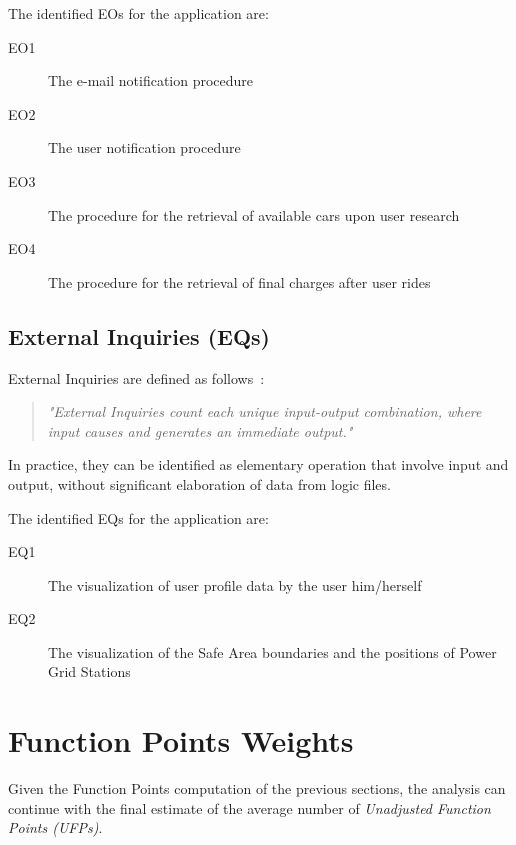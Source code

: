 The identified EOs for the application are:
\begin{description}
\item[EO1] The e-mail notification procedure %
\item[EO2] The user notification procedure %
\item[EO3] The procedure for the retrieval of available cars upon user research %
\item[EO4] The procedure for the retrieval of final charges after user rides %
\end{description}

\subsection{External Inquiries (EQs)}
External Inquiries are defined as follows~\cite{cocomo-manual}:
\begin{quotation}
\textit{"External Inquiries count each unique input-output combination, where input causes and generates an immediate output."}
\end{quotation}
In practice, they can be identified as elementary operation that involve input and output, without significant elaboration of data from logic files.

The identified EQs for the application are:
\begin{description}
\item[EQ1] The visualization of user profile data by the user him/herself %
\item[EQ2] The visualization of the Safe Area boundaries and the positions of Power Grid Stations %
\end{description}

\section{Function Points Weights}
Given the Function Points computation of the previous sections, the analysis can continue with the final estimate of the average number of \textit{Unadjusted Function Points (UFPs)}.

